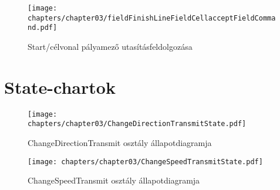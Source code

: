 \begin{figure}[h]
	\begin{center}
		\texttt{[image: chapters/chapter03/fieldFinishLineFieldCellacceptFieldCommand.pdf]}
		\caption{Start/célvonal pályamező utasításfeldolgozása}
		\label{fig:field.FinishLineFieldCell.accept}
	\end{center}
\end{figure}

\clearpage

\section{State-chartok}
\begin{figure}[h]
	\begin{center}
		\texttt{[image: chapters/chapter03/ChangeDirectionTransmitState.pdf]}
		\caption{ChangeDirectionTransmit osztály állapotdiagramja}
		\label{fig:state.ChangeDirectionTransmit}
	\end{center}
\end{figure}

\begin{figure}[h]
	\begin{center}
		\texttt{[image: chapters/chapter03/ChangeSpeedTransmitState.pdf]}
		\caption{ChangeSpeedTransmit osztály állapotdiagramja}
		\label{fig:state.ChangeSpeedTransmit}
	\end{center}
\end{figure}

\clearpage